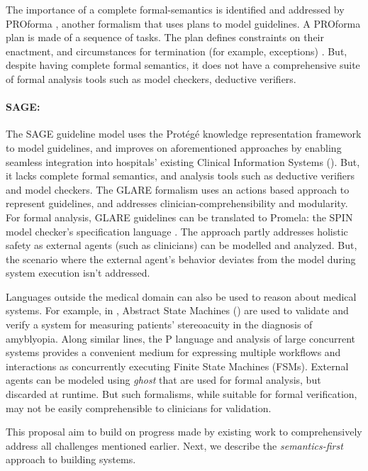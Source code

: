 The importance of a complete formal-semantics is identified and addressed
by PROforma \cite{SuttonAMIA03}, another formalism that uses plans to
model guidelines. A PROforma plan is made of a sequence of tasks.
The plan defines constraints on their enactment, and circumstances
for termination (for example, exceptions) \cite{SuttonAMIA03}. But, despite
having complete formal semantics, it does not have a comprehensive suite of
formal analysis tools such as model checkers, deductive verifiers.

\paragraph{SAGE:}
The SAGE guideline model \cite{TuSAGE04} uses the Prot\'eg\'e knowledge
representation framework \cite{NoyAMIA03} to model guidelines,
and improves on aforementioned approaches by
enabling seamless integration into hospitals' existing Clinical Information Systems
(\CISs). But, it lacks complete formal semantics, and analysis tools
such as deductive verifiers and model checkers.
The GLARE formalism \cite{TerenzianiBook04} uses an actions based approach
to represent guidelines, and addresses clinician-comprehensibility and
modularity. For formal analysis, GLARE guidelines can be translated to
Promela: the SPIN model checker's specification language \cite{GiordanoAMIA06}.
The approach partly addresses holistic safety as
external agents (such as clinicians) can be modelled and analyzed.
But, the scenario where the external agent's behavior
deviates from the model during system execution isn't addressed.


Languages outside the medical domain can also be used to reason about
medical systems. For example, in \cite{ArcainiMEMCODE15}, Abstract State
Machines (\ASMs) are used to validate and verify a system for measuring
patients' stereoacuity in the diagnosis of amyblyopia.
Along similar lines, the P language \cite{DesaiPLDI13}
and analysis of large concurrent systems provides a convenient medium
for expressing multiple workflows and interactions as concurrently
executing Finite State Machines (FSMs). External agents can be modeled
using \emph{ghost} that are used for formal analysis, but discarded at runtime.
But such formalisms, while suitable for formal verification, may
not be easily comprehensible to clinicians for validation.

This proposal aim to build on progress made by existing work to comprehensively
address all challenges mentioned earlier. Next, we describe the
\emph{semantics-first} approach to building systems.

